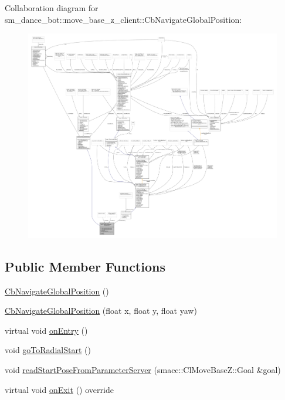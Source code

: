 Collaboration diagram for sm\+\_\+dance\+\_\+bot\+:\+:move\+\_\+base\+\_\+z\+\_\+client\+:\+:Cb\+Navigate\+Global\+Position\+:
\nopagebreak
\begin{figure}[H]
\begin{center}
\leavevmode
\includegraphics[width=350pt]{classsm__dance__bot_1_1move__base__z__client_1_1CbNavigateGlobalPosition__coll__graph}
\end{center}
\end{figure}
\subsection*{Public Member Functions}
\begin{DoxyCompactItemize}
\item 
\hyperlink{classsm__dance__bot_1_1move__base__z__client_1_1CbNavigateGlobalPosition_aa9346ec96bd44862a7e36fffff54bdb8}{Cb\+Navigate\+Global\+Position} ()
\item 
\hyperlink{classsm__dance__bot_1_1move__base__z__client_1_1CbNavigateGlobalPosition_aaa061279a6dbdf8ee5d5d02d5bab1098}{Cb\+Navigate\+Global\+Position} (float x, float y, float yaw)
\item 
virtual void \hyperlink{classsm__dance__bot_1_1move__base__z__client_1_1CbNavigateGlobalPosition_a8ad5cc3b238e6964043213f7dbead1dd}{on\+Entry} ()
\item 
void \hyperlink{classsm__dance__bot_1_1move__base__z__client_1_1CbNavigateGlobalPosition_aa7e91d17625df52b94bb29a9cd1ae7e5}{go\+To\+Radial\+Start} ()
\item 
void \hyperlink{classsm__dance__bot_1_1move__base__z__client_1_1CbNavigateGlobalPosition_a79dc46f7a60a0322d27ee4db0ab11ad7}{read\+Start\+Pose\+From\+Parameter\+Server} (smacc\+::\+Cl\+Move\+Base\+Z\+::\+Goal \&goal)
\item 
virtual void \hyperlink{classsm__dance__bot_1_1move__base__z__client_1_1CbNavigateGlobalPosition_a5191a81c97253290c73e039dfda88aa9}{on\+Exit} () override
\end{DoxyCompactItemize}
